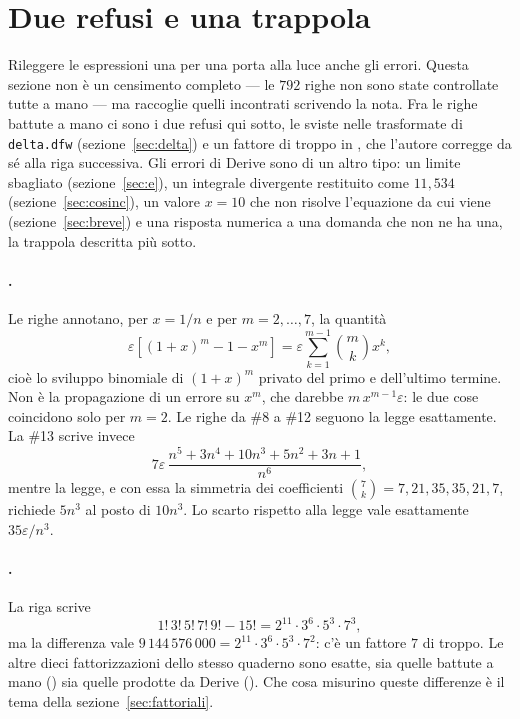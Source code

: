 \section{Due refusi e una trappola}
\label{sec:refusi}

Rileggere le espressioni una per una porta alla luce anche gli errori. Questa
sezione non \`e un censimento completo --- le $792$ righe non sono state
controllate tutte a mano --- ma raccoglie quelli incontrati scrivendo la
nota. Fra le righe battute a mano ci sono i due refusi qui sotto, le sviste
nelle trasformate di \texttt{delta.dfw} (sezione~\ref{sec:delta}) e un
fattore di troppo in , che l'autore corregge da s\'e alla
riga successiva. Gli errori di Derive sono di un altro tipo: un limite
sbagliato (sezione~\ref{sec:e}), un integrale divergente restituito come
$11{,}534$ (sezione~\ref{sec:cosinc}), un valore $x=10$ che non risolve
l'equazione da cui viene (sezione~\ref{sec:breve}) e una risposta numerica a
una domanda che non ne ha una, la trappola descritta pi\`u sotto.

\paragraph{.}
Le righe  annotano, per $x=1/n$ e per
$m=2,\dots,7$, la quantit\`a
\[
  \varepsilon\left[(1+x)^m-1-x^m\right]
  =\varepsilon\sum_{k=1}^{m-1}\binom{m}{k}x^k ,
\]
cio\`e lo sviluppo binomiale di $(1+x)^m$ privato del primo e dell'ultimo
termine. Non \`e la propagazione di un errore su $x^m$, che darebbe
$m\,x^{m-1}\varepsilon$: le due cose coincidono solo per $m=2$. Le righe da
\#8 a \#12 seguono la legge esattamente. La \#13 scrive invece
\[
  7\varepsilon\,\frac{n^5+3n^4+10n^3+5n^2+3n+1}{n^6},
\]
mentre la legge, e con essa la simmetria dei coefficienti
$\binom{7}{k}=7,21,35,35,21,7$, richiede $5n^3$ al posto di $10n^3$. Lo
scarto rispetto alla legge vale esattamente $35\varepsilon/n^3$.

\paragraph{.}
La riga scrive
\[
  1!\,3!\,5!\,7!\,9!-15!=2^{11}\cdot 3^{6}\cdot 5^{3}\cdot 7^{3},
\]
ma la differenza vale $9\,144\,576\,000=2^{11}\cdot3^{6}\cdot5^{3}\cdot7^{2}$:
c'\`e un fattore $7$ di troppo. Le altre dieci fattorizzazioni dello stesso
quaderno sono esatte, sia quelle battute a mano ()
sia quelle prodotte da Derive (). Che cosa misurino
queste differenze \`e il tema della sezione~\ref{sec:fattoriali}.

